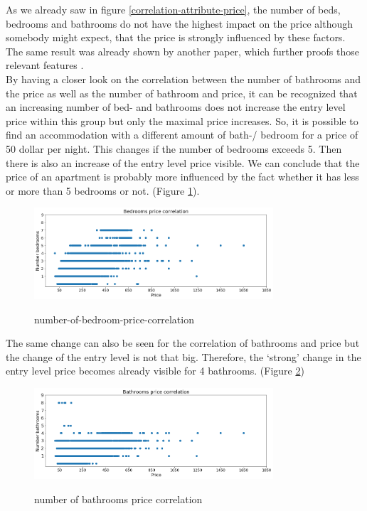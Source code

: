 \documentclass[journal]{IEEEtran}
\begin{document}
As we already saw in figure \ref{correlation-attribute-price}, the number of beds, bedrooms and bathrooms do not have the highest impact on the price although somebody might expect, that the price is strongly influenced by these factors. \\
The same result was already shown by another paper, which further proofs those relevant features \cite{RN1}.\\ By having a closer look on the correlation between the number of bathrooms and the price as well as the number of bathroom and price, it can be recognized that an increasing number of bed- and bathrooms does not increase the entry level price within this group but only the maximal price increases. So, it is possible to find an accommodation with a different amount of bath-/ bedroom for a price of 50 dollar per night. This changes if the number of bedrooms exceeds 5. Then there is also an increase of the entry level price visible. We can conclude that the price of an apartment is probably more influenced by the fact whether it has less or more than 5 bedrooms or not. (Figure \ref{bedroom-price-correlation}).

\begin{figure}
  \begin{center}
  \includegraphics[width=3.5in]{photo/10_bedrooms_price_correlation.png}\\
  \caption{number-of-bedroom-price-correlation}\label{bedroom-price-correlation}
  \end{center}
\end{figure}

The same change can also be seen for the correlation of bathrooms and price but the change of the entry level is not that big. Therefore, the ‘strong’ change in the entry level price becomes already visible for 4 bathrooms. (Figure \ref{bathrooms-price-correlation})
\begin{figure}
  \begin{center}
  \includegraphics[width=3.5in]{photo/9_bathroom_price_correlation.png}\\
  \caption{number of bathrooms price correlation}\label{bathrooms-price-correlation}
  \end{center}
\end{figure}
\end{document}
